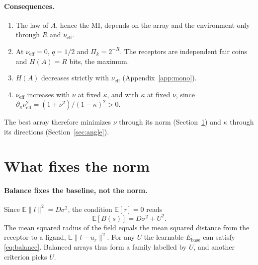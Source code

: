 \documentclass[11pt,a4paper]{article}
\newcommand{\EE}{\mathbb{E}}
\newcommand{\Ebase}{E_{\mathrm{base}}}
\newcommand{\nueff}{\nu_{\mathrm{eff}}}
\begin{document}
\paragraph{Consequences.}
\begin{enumerate}
\item The law of $A$, hence the MI, depends on the array and the environment only through
  $R$ and $\nueff$.
\item At $\nueff=0$, $q=1/2$ and $\Pi_k=2^{-R}$. The receptors are independent fair coins
  and $H(A)=R$ bits, the maximum.
\item $H(A)$ decreases strictly with $\nueff$ (Appendix~\ref{app:mono}).
\item $\nueff$ increases with $\nu$ at fixed $\kappa$, and with $\kappa$ at fixed $\nu$,
  since $\partial_\kappa\nueff^2=(1+\nu^2)/(1-\kappa)^2>0$.
\end{enumerate}
The best array therefore minimizes $\nu$ through its norm (Section~\ref{sec:norm}) and
$\kappa$ through its directions (Section~\ref{sec:angle}).

\section{What fixes the norm}
\label{sec:norm}

\paragraph{Balance fixes the baseline, not the norm.} Since $\EE\|l\|^2=D\sigma^2$, the
condition $\EE[\tau]=0$ reads
\begin{equation}
  \EE[B(s)]=D\sigma^2+U^2 .
  \label{eq:balance}
\end{equation}
The mean squared radius of the field equals the mean squared distance from the receptor to
a ligand, $\EE\|l-u_r\|^2$. For any $U$ the learnable $\Ebase$ can satisfy
\eqref{eq:balance}. Balanced arrays thus form a family labelled by $U$, and another
criterion picks $U$.
\end{document}
